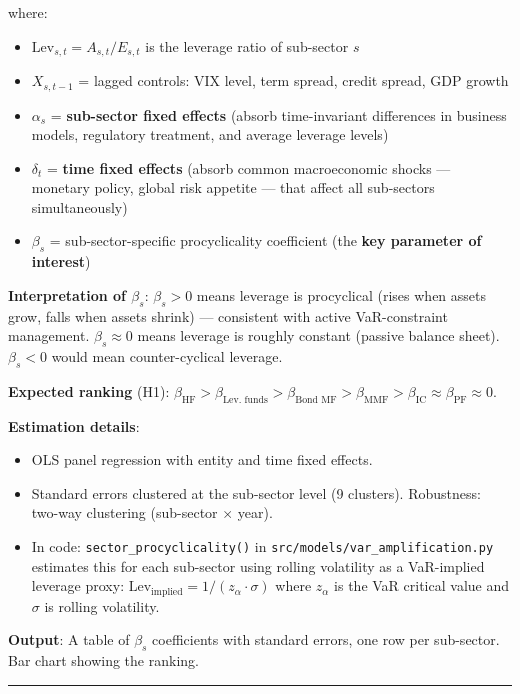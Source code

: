 \documentclass[11pt,a4paper]{article}
\begin{document}
where:
\begin{itemize}
\item $\text{Lev}_{s,t} = A_{s,t} / E_{s,t}$ is the leverage ratio of sub-sector $s$
\item $X_{s,t-1}$ = lagged controls: VIX level, term spread, credit spread, GDP growth
\item $\alpha_s$ = \textbf{sub-sector fixed effects} (absorb time-invariant differences in business models, regulatory treatment, and average leverage levels)
\item $\delta_t$ = \textbf{time fixed effects} (absorb common macroeconomic shocks --- monetary policy, global risk appetite --- that affect all sub-sectors simultaneously)
\item $\beta_s$ = sub-sector-specific procyclicality coefficient (the \textbf{key parameter of interest})

\end{itemize}
\textbf{Interpretation of $\beta_s$}: $\beta_s > 0$ means leverage is procyclical (rises when assets grow, falls when assets shrink) --- consistent with active VaR-constraint management. $\beta_s \approx 0$ means leverage is roughly constant (passive balance sheet). $\beta_s < 0$ would mean counter-cyclical leverage.

\textbf{Expected ranking} (H1): $\beta_{\text{HF}} > \beta_{\text{Lev. funds}} > \beta_{\text{Bond MF}} > \beta_{\text{MMF}} > \beta_{\text{IC}} \approx \beta_{\text{PF}} \approx 0$.

\textbf{Estimation details}:
\begin{itemize}
\item OLS panel regression with entity and time fixed effects.
\item Standard errors clustered at the sub-sector level (9 clusters). Robustness: two-way clustering (sub-sector $\times$ year).
\item In code: \texttt{sector\_procyclicality()} in \texttt{src/models/var\_amplification.py} estimates this for each sub-sector using rolling volatility as a VaR-implied leverage proxy: $\text{Lev}_{\text{implied}} = 1/(z_\alpha \cdot \sigma)$ where $z_\alpha$ is the VaR critical value and $\sigma$ is rolling volatility.

\end{itemize}
\textbf{Output}: A table of $\beta_s$ coefficients with standard errors, one row per sub-sector. Bar chart showing the ranking.


\bigskip\noindent\rule{\textwidth}{0.4pt}\bigskip
\end{document}
